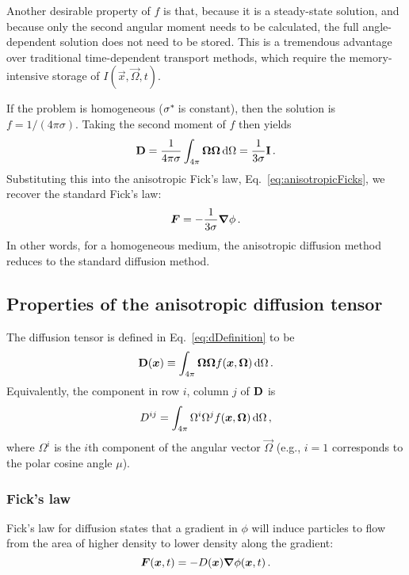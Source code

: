 Another desirable property of $f$ is that, because it is a steady-state
solution, and because only the second angular moment
needs to be calculated, the
full angle-dependent solution does not need to be stored. This is a tremendous
advantage over traditional time-dependent transport methods, which require the
memory-intensive storage of $I(\vec{x},\vec{\Omega},t)$.

If the problem is homogeneous ($\sigma^{*\!}$ is constant), then the solution is
$f=1/(4\pi\sigma)$. Taking the second moment of $f$ then yields
\begin{equation*}
  \mathbf{D} = \frac{1}{4\pi\sigma} \int_{4\pi} \bm{\Omega} \bm{\Omega} \mathop{}\!\mathrm{d} \Omega
  = \frac{1}{3\sigma} \mathbf{I}\,.
\end{equation*}
Substituting this into the anisotropic Fick's law,
Eq.~\eqref{eq:anisotropicFicks}, we recover the standard Fick's law:
\begin{equation*}
  \bm{F} = - \frac{1}{3\sigma} \bm{\nabla} \phi\,.
\end{equation*}
In other words, for a homogeneous medium, the anisotropic diffusion method
reduces to the standard diffusion method.

\subsection{Properties of the anisotropic diffusion tensor}
The diffusion tensor is defined in Eq.~\eqref{eq:dDefinition} to be
\begin{equation*}
  \mathbf{D}(\bm{x}) \equiv \int_{4\pi} \bm{\Omega} \bm{\Omega}
  f(\bm{x}, \bm{\Omega}) \mathop{}\!\mathrm{d}\Omega \,.
\end{equation*}
Equivalently, the component in row $i$, column $j$ of $\mathbf{D}$ is
\begin{equation}\label{eq:dij}
  D^{ij} = \int_{4\pi} \Omega^i \Omega^j
  f(\bm{x}, \bm{\Omega}) \mathop{}\!\mathrm{d}\Omega \,,
\end{equation}
where $\Omega^i$ is the $i$th component of the angular vector $\vec{\Omega}$
(e.g., $i=1$ corresponds to the polar cosine angle $\mu$).

\subsubsection{Fick's law}
Fick's law for diffusion states that a gradient in $\phi$ will induce particles
to flow from the area of higher density to lower density along the gradient:
\begin{equation*}
  \bm{F}(\bm{x},t) = - D(\bm{x}) \bm{\nabla} \phi(\bm{x},t)\,.
\end{equation*}

